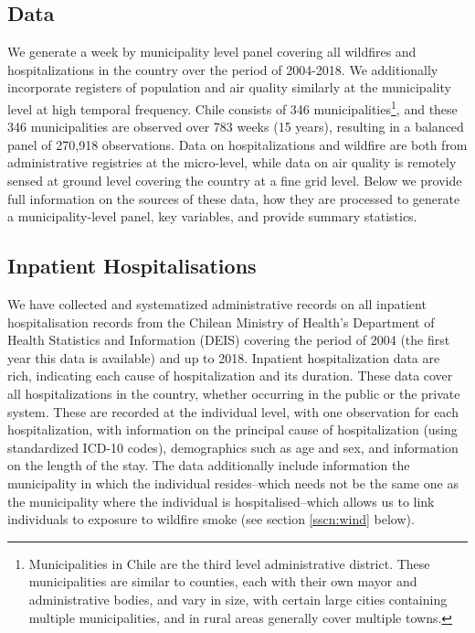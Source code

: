 \documentclass[11pt]{article}
\begin{document}
\begin{spacing}{1.5}
\section{Data}
\label{scn:data} 
We generate a week by municipality level panel covering all wildfires and hospitalizations in the country over the period of 2004-2018.  We additionally incorporate registers of population and air quality similarly at the municipality level at high temporal frequency.  Chile consists of 346 municipalities\footnote{Municipalities in Chile are the third level administrative district.  These municipalities are similar to counties, each with their own mayor and administrative bodies, and vary in size, with certain large cities containing multiple municipalities, and in rural areas generally cover multiple towns.}, and these 346 municipalities are observed over 783 weeks (15 years), resulting in a balanced panel of 270,918 observations.
Data on hospitalizations and wildfire are both from administrative registries at the micro-level, while data on air quality is remotely sensed at ground level covering the country at a fine grid level.  Below we provide full information on the sources of these data, how they are processed to generate a municipality-level panel, key variables, and provide summary statistics. 

\subsection{Inpatient Hospitalisations}
\label{sscn:hospitalisations} 
We have collected and systematized administrative records on all inpatient hospitalisation records from the Chilean Ministry of Health's Department of Health Statistics and Information (DEIS) covering the period of 2004 (the first year this data is available) and up to 2018. Inpatient hospitalization data are rich, indicating each cause of hospitalization and its duration.  These data cover all hospitalizations in the country, whether occurring in the public or the private system. These are recorded at the individual level, with one observation for each hospitalization, with information on the principal cause of hospitalization (using standardized ICD-10 codes), demographics such as age and sex, and information on the length of the stay.  The data additionally include information the municipality in which the individual resides--which needs not be the same one as the municipality where the individual is hospitalised--which allows us to link individuals to exposure to wildfire smoke (see section \ref{sscn:wind} below). 


\end{spacing}
\end{document}
